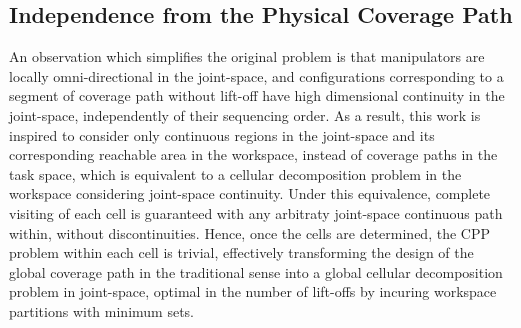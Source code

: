 \documentclass[journal]{IEEEtran}
\begin{document}
\subsection{Independence from the Physical Coverage Path}
An observation which simplifies the original problem is that manipulators are locally omni-directional in the joint-space, and configurations corresponding to a segment of coverage path without lift-off have high dimensional continuity in the joint-space, independently of their sequencing order. 
As a result, this work is inspired to consider only continuous regions in the joint-space and its corresponding reachable area in the workspace, instead of coverage paths in the task space, which is equivalent to a cellular decomposition problem in the workspace considering joint-space continuity. Under this equivalence, complete visiting of each cell is guaranteed with any arbitraty joint-space continuous path within, without discontinuities. 
Hence, once the cells are determined, the CPP problem within each cell 
is trivial, effectively transforming the design of the global coverage path in the traditional sense into a global cellular decomposition problem in joint-space, optimal in the number of lift-offs by incuring workspace partitions with minimum sets.
 
\end{document}
